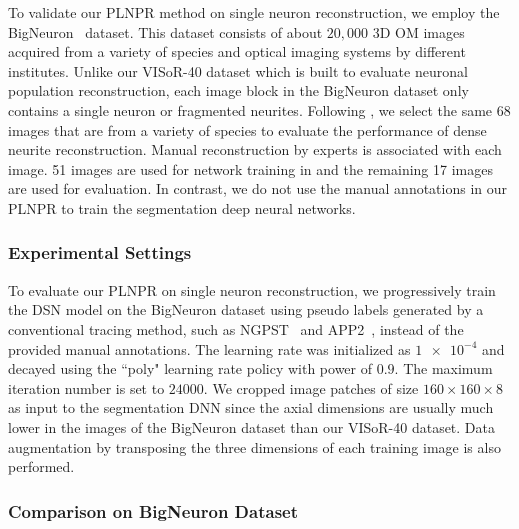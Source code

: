 To validate our PLNPR method on single neuron reconstruction, we employ the BigNeuron~\cite{peng2015} dataset. 
This dataset consists of about $20,000$ 3D OM images acquired from a variety of species and optical imaging systems by different institutes.
Unlike our VISoR-40 dataset which is built to evaluate neuronal population reconstruction, each image block in the BigNeuron dataset only contains a single neuron or fragmented neurites.
Following \cite{Li2017}, we select the same 68 images that are from a variety of species to evaluate the performance of dense neurite reconstruction.
Manual reconstruction by experts is associated with each image. 
51 images are used for network training in \cite{Li2017} and the remaining 17 images are used for evaluation.
In contrast, we do not use the manual annotations in our PLNPR to train the segmentation deep neural networks. 


\subsubsection{Experimental Settings}
 
 
To evaluate our PLNPR on single neuron reconstruction, we progressively train the DSN model on the BigNeuron dataset using pseudo labels generated by a conventional tracing method, such as NGPST~\cite{Quan2015} and APP2~\cite{Xiao2013}, instead of the provided manual annotations.
%
The learning rate was initialized as $\num{1e-4}$ and decayed using the ``poly" learning rate policy with power of $0.9$. The maximum iteration number is set to $ 24000 $. 
We cropped image patches of size $160\times 160\times 8$ as input to the segmentation DNN since the axial dimensions are usually much lower in the images of the BigNeuron dataset than our VISoR-40 dataset.
Data augmentation by transposing the three dimensions of each training image is also performed. 


\subsubsection{Comparison on BigNeuron Dataset}

